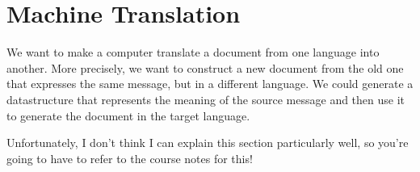 \section{Machine Translation}

We want to make a computer translate a document from one language into another.
More precisely, we want to construct a new document from the old one that
expresses the same message, but in a different language. We could generate a
datastructure that represents the meaning of the source message and then use it
to generate the document in the target language.

Unfortunately, I don't think I can explain this section particularly well, so
you're going to have to refer to the course notes for this!
